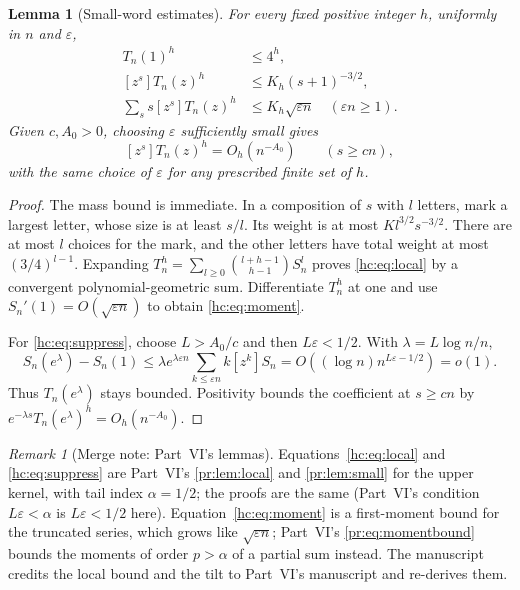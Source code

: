 \documentclass[11pt,a4paper]{article}
\newtheorem{lemma}[lemma]{Lemma}
\theoremstyle{definition}\newaliascnt{definition}{theorem}
\theoremstyle{remark}\newaliascnt{remark}{theorem}
\newtheorem{remark}[remark]{Remark}
\begin{document}
\begin{lemma}[Small-word estimates]\label{hc:lem:small}
For every fixed positive integer $h$, uniformly in $n$ and $\varepsilon$,
\begin{align}
 T_n(1)^h&\le4^h,\label{hc:eq:massbound}\\
 [z^s]T_n(z)^h&\le K_h(s+1)^{-3/2},\label{hc:eq:local}\\
 \sum_s s[z^s]T_n(z)^h&\le K_h\sqrt{\varepsilon n}
 \quad(\varepsilon n\ge1).\label{hc:eq:moment}
\end{align}
Given $c,A_0>0$, choosing $\varepsilon$ sufficiently small gives
\begin{equation}\label{hc:eq:suppress}
 [z^s]T_n(z)^h=O_h(n^{-A_0})\qquad(s\ge cn),
\end{equation}
with the same choice of $\varepsilon$ for any prescribed finite set of $h$.
\end{lemma}
\begin{proof}
The mass bound is immediate. In a composition of $s$ with $l$ letters, mark
a largest letter, whose size is at least $s/l$. Its weight is at most
$Kl^{3/2}s^{-3/2}$. There are at most $l$ choices for the mark, and the other
letters have total weight at most $(3/4)^{l-1}$. Expanding
$T_n^h=\sum_{l\ge0}\binom{l+h-1}{h-1}S_n^l$ proves \eqref{hc:eq:local} by a
convergent polynomial-geometric sum. Differentiate $T_n^h$ at one and use
$S_n'(1)=O(\sqrt{\varepsilon n})$ to obtain \eqref{hc:eq:moment}.

For \eqref{hc:eq:suppress}, choose $L>A_0/c$ and then $L\varepsilon<1/2$.
With $\lambda=L\log n/n$,
\[
 S_n(e^\lambda)-S_n(1)
 \le\lambda e^{\lambda\varepsilon n}
 \sum_{k\le\varepsilon n}k[z^k]S_n
 =O\!\left((\log n)n^{L\varepsilon-1/2}\right)=o(1).
\]
Thus $T_n(e^\lambda)$ stays bounded. Positivity bounds the coefficient at
$s\ge cn$ by $e^{-\lambda s}T_n(e^\lambda)^h=O_h(n^{-A_0})$.
\end{proof}

\begin{remark}[Merge note: Part~VI's lemmas]
Equations~\eqref{hc:eq:local} and \eqref{hc:eq:suppress} are Part~VI's
\cref{pr:lem:local} and \cref{pr:lem:small} for the upper kernel, with tail
index $\alpha=1/2$; the proofs are the same (Part~VI's condition
$L\varepsilon<\alpha$ is $L\varepsilon<1/2$ here). Equation~\eqref{hc:eq:moment} is a
first-moment bound for the truncated series, which grows like
$\sqrt{\varepsilon n}$; Part~VI's \eqref{pr:eq:momentbound} bounds the
moments of order $p>\alpha$ of a partial sum instead. The manuscript credits
the local bound and the tilt to Part~VI's manuscript and re-derives them.
\end{remark}
\end{document}
